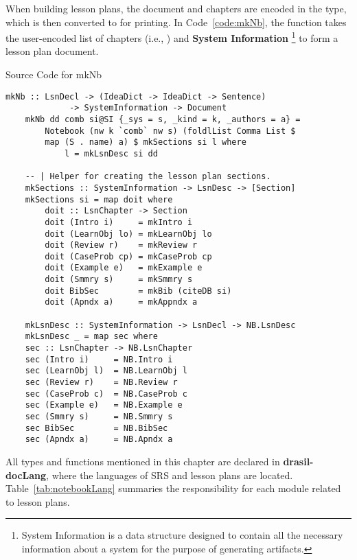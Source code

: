 When building lesson plans, the document and chapters are encoded in the 
 type, which is then converted to  for 
printing. In Code~\ref{code:mkNb}, the  function takes the 
user-encoded list of chapters (i.e., ) and \textbf{System 
Information} \footnote{System Information is a data structure designed to 
contain all the necessary information about a system for the purpose of 
generating artifacts.} to form a lesson plan document.

\begin{listing}[h!]
	\caption{Source Code for mkNb}
	\label{code:mkNb}
	\begin{lstlisting}[language=haskell1]
	mkNb :: LsnDecl -> (IdeaDict -> IdeaDict -> Sentence) 
			 -> SystemInformation -> Document
	mkNb dd comb si@SI {_sys = s, _kind = k, _authors = a} =
		Notebook (nw k `comb` nw s) (foldlList Comma List $ 
		map (S . name) a) $	mkSections si l where
			l = mkLsnDesc si dd
	
	-- | Helper for creating the lesson plan sections.
	mkSections :: SystemInformation -> LsnDesc -> [Section]
	mkSections si = map doit where
		doit :: LsnChapter -> Section
		doit (Intro i)     = mkIntro i
		doit (LearnObj lo) = mkLearnObj lo
		doit (Review r)    = mkReview r
		doit (CaseProb cp) = mkCaseProb cp
		doit (Example e)   = mkExample e
		doit (Smmry s)     = mkSmmry s
		doit BibSec        = mkBib (citeDB si)
		doit (Apndx a)     = mkAppndx a
	
	mkLsnDesc :: SystemInformation -> LsnDecl -> NB.LsnDesc
	mkLsnDesc _ = map sec where
	sec :: LsnChapter -> NB.LsnChapter
	sec (Intro i)     = NB.Intro i
	sec (LearnObj l)  = NB.LearnObj l
	sec (Review r)    = NB.Review r  
	sec (CaseProb c)  = NB.CaseProb c
	sec (Example e)   = NB.Example e  
	sec (Smmry s)     = NB.Smmry s
	sec BibSec        = NB.BibSec
	sec (Apndx a)     = NB.Apndx a
	\end{lstlisting}
\end{listing}

All types and functions mentioned in this chapter are declared in 
\textbf{drasil-docLang}, where the languages of SRS and lesson plans are 
located. Table~\ref{tab:notebookLang} summaries the responsibility for each 
module related to lesson plans.

